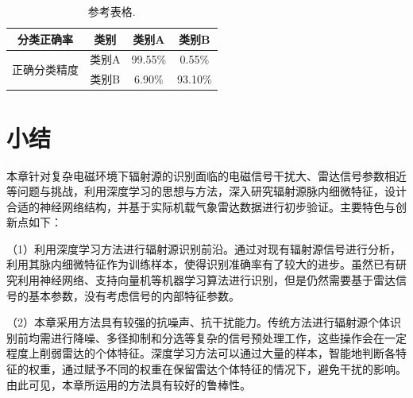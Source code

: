 

\begin{table}[!t]
	\renewcommand{\arraystretch}{1.3}
	\caption{参考表格.}
	\centering
	\begin{tabular}{c|c|c|c}
		\hline
		 分类正确率 & 类别 & 类别A & 类别B \\
		 \hline
		\multirow{2}{*}{正确分类精度}
		 & 类别A & 99.55\% & 0.55\% \\
		\cline{2-4}
		 & 类别B & 6.90\% & 93.10\% \\		
		
		\hline
	\end{tabular}
\end{table}

\section{小结}
本章针对复杂电磁环境下辐射源的识别面临的电磁信号干扰大、雷达信号参数相近等问题与挑战，利用深度学习的思想与方法，深入研究辐射源脉内细微特征，设计合适的神经网络结构，并基于实际机载气象雷达数据进行初步验证。主要特色与创新点如下：

（1）利用深度学习方法进行辐射源识别前沿。通过对现有辐射源信号进行分析，利用其脉内细微特征作为训练样本，使得识别准确率有了较大的进步。虽然已有研究利用神经网络、支持向量机等机器学习算法进行识别，但是仍然需要基于雷达信号的基本参数，没有考虑信号的内部特征参数。

（2）本章采用方法具有较强的抗噪声、抗干扰能力。传统方法进行辐射源个体识别前均需进行降噪、多径抑制和分选等复杂的信号预处理工作，这些操作会在一定程度上削弱雷达的个体特征。深度学习方法可以通过大量的样本，智能地判断各特征的权重，通过赋予不同的权重在保留雷达个体特征的情况下，避免干扰的影响。由此可见，本章所运用的方法具有较好的鲁棒性。


